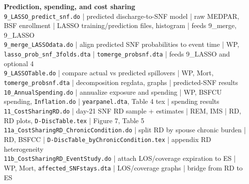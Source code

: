 \documentclass[11pt]{article}
\begin{document}
{\smallskip
\textbf{Prediction, spending, and cost sharing}\\
\nolinkurl{9_LASSO_predict_snf.do} | predicted discharge-to-SNF model | raw MEDPAR, BSF enrollment | LASSO training/prediction files, histogram | feeds 9\_merge, 9\_LASSO\\
\nolinkurl{9_merge_LASSOdata.do} | align predicted SNF probabilities to event time | WP, \nolinkurl{lasso_prob_snf_3folds.dta} | \nolinkurl{tomerge_probsnf.dta} | feeds 9\_LASSO and optional 4\\
\nolinkurl{9_LASSOTable.do} | compare actual vs predicted spillovers | WP, Mort, \nolinkurl{tomerge_probsnf.dta} | decomposition regdata, graphs | predicted-SNF results\\
\nolinkurl{10_AnnualSpending.do} | annualize exposure and spending | WP, BSFCU spending, \nolinkurl{Inflation.do} | \nolinkurl{yearpanel.dta}, Table 4 tex | spending results\\
\nolinkurl{11_CostSharingRD.do} | day-21 SNF RD sample + estimates | REM, IMS | RD, RD plots, \nolinkurl{D-DiscTable.tex} | Figure 7, Table 5\\
\nolinkurl{11a_CostSharingRD_ChronicCondition.do} | split RD by spouse chronic burden | RD, BSFCC | \nolinkurl{D-DiscTable_byChronicCondition.tex} | appendix RD heterogeneity\\
\nolinkurl{11b_CostSharingRD_EventStudy.do} | attach LOS/coverage expiration to ES | WP, Mort, \nolinkurl{affected_SNFstays.dta} | LOS/coverage graphs | bridge from RD to ES\\

}
\end{document}
